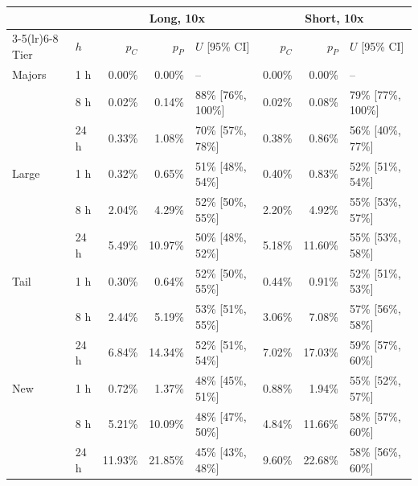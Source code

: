 \begin{tabular}{@{}llrrlrrl@{}}
\toprule
 & & \multicolumn{3}{c}{Long, 10x} & \multicolumn{3}{c}{Short, 10x} \\
\cmidrule(lr){3-5}\cmidrule(lr){6-8}
Tier & $h$ & $p_C$ & $p_P$ & $U$ [95\% CI] & $p_C$ & $p_P$ & $U$ [95\% CI] \\
\midrule
Majors & 1 h & 0.00\% & 0.00\% & -- & 0.00\% & 0.00\% & -- \\
 & 8 h & 0.02\% & 0.14\% & 88\% \scriptsize[76\%, 100\%] & 0.02\% & 0.08\% & 79\% \scriptsize[77\%, 100\%] \\
 & 24 h & 0.33\% & 1.08\% & 70\% \scriptsize[57\%, 78\%] & 0.38\% & 0.86\% & 56\% \scriptsize[40\%, 77\%] \\
\addlinespace[2pt]
Large & 1 h & 0.32\% & 0.65\% & 51\% \scriptsize[48\%, 54\%] & 0.40\% & 0.83\% & 52\% \scriptsize[51\%, 54\%] \\
 & 8 h & 2.04\% & 4.29\% & 52\% \scriptsize[50\%, 55\%] & 2.20\% & 4.92\% & 55\% \scriptsize[53\%, 57\%] \\
 & 24 h & 5.49\% & 10.97\% & 50\% \scriptsize[48\%, 52\%] & 5.18\% & 11.60\% & 55\% \scriptsize[53\%, 58\%] \\
\addlinespace[2pt]
Tail & 1 h & 0.30\% & 0.64\% & 52\% \scriptsize[50\%, 55\%] & 0.44\% & 0.91\% & 52\% \scriptsize[51\%, 53\%] \\
 & 8 h & 2.44\% & 5.19\% & 53\% \scriptsize[51\%, 55\%] & 3.06\% & 7.08\% & 57\% \scriptsize[56\%, 58\%] \\
 & 24 h & 6.84\% & 14.34\% & 52\% \scriptsize[51\%, 54\%] & 7.02\% & 17.03\% & 59\% \scriptsize[57\%, 60\%] \\
\addlinespace[2pt]
New & 1 h & 0.72\% & 1.37\% & 48\% \scriptsize[45\%, 51\%] & 0.88\% & 1.94\% & 55\% \scriptsize[52\%, 57\%] \\
 & 8 h & 5.21\% & 10.09\% & 48\% \scriptsize[47\%, 50\%] & 4.84\% & 11.66\% & 58\% \scriptsize[57\%, 60\%] \\
 & 24 h & 11.93\% & 21.85\% & 45\% \scriptsize[43\%, 48\%] & 9.60\% & 22.68\% & 58\% \scriptsize[56\%, 60\%] \\
\bottomrule
\end{tabular}
